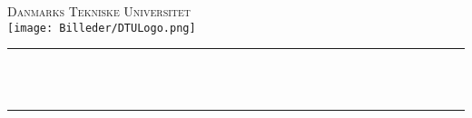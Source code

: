 \begin{titlepage} %
	\newcommand{\HRule}{\rule{\linewidth}{0.5mm}} %
	
	\center %
	   
	
	
	\textsc{\LARGE Danmarks Tekniske Universitet}\\[1.5cm] %
	
    \texttt{[image: Billeder/DTULogo.png]}\\
	
	
	\vfill
	\HRule\\[0.5cm]
	
	{\huge\bfseries \kursusnavn\ \kursusnummer}\\[0.4cm] %

	\HRule\\[0.5cm]
	
	\textsc{\Large \afleveringnavn}\\[1cm] %
	
    \begin{minipage}{0.4\textwidth}
		\begin{flushleft}
            \centering
            \large
            \authortwo \\
            \authortwoID \\ [0.2cm]
            \authorone \\ 
            \authoroneID \\ [0.2cm]
            \authorfour \\
            \authorfourID \\ [0.2cm]
            \authorthree \\
            \authorthreeID \\ [0.8cm]
            

\end{flushleft}
\end{minipage}
\end{titlepage}
